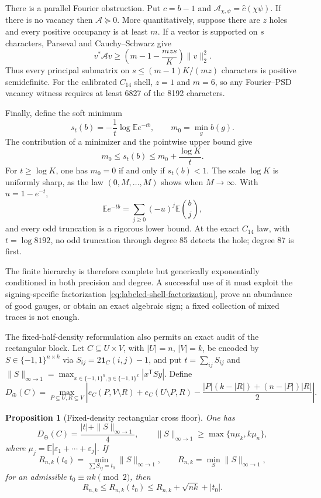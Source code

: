 \documentclass[11pt]{article}
\newtheorem{proposition}[theorem]{Proposition}
\newcommand{\eps}{\{-1,1\}}
\newcommand{\E}{\mathbb E}
\begin{document}
There is a parallel Fourier obstruction.  Put $c=b-1$ and
$\mathcal A_{\chi,\psi}=\widehat c(\chi\psi)$.  If there is no vacancy then
$\mathcal A\succeq0$.  More quantitatively, suppose there are $z$ holes and
every positive occupancy is at least $m$.  If a vector is supported on $s$
characters, Parseval and Cauchy--Schwarz give
\[
 v^*\mathcal Av\ge
 \left(m-1-\frac{mzs}{K}\right)\|v\|_2^2.
\]
Thus every principal submatrix on
$s\le(m-1)K/(mz)$ characters is positive semidefinite.  For the calibrated
$C_{14}$ shell, $z=1$ and $m=6$, so any Fourier--PSD vacancy witness requires
at least 6827 of the 8192 characters.

Finally, define the soft minimum
\[
 s_t(b)=-\frac1t\log\E e^{-tb},\qquad m_0=\min_gb(g).
\]
The contribution of a minimizer and the pointwise upper bound give
\begin{equation}
 m_0\le s_t(b)\le m_0+\frac{\log K}{t}.                \label{eq:soft-vacancy}
\end{equation}
For $t\ge\log K$, one has $m_0=0$ if and only if $s_t(b)<1$.  The scale
$\log K$ is uniformly sharp, as the law $(0,M,\ldots,M)$ shows when
$M\to\infty$.  With $u=1-e^{-t}$,
\[
 \E e^{-tb}=\sum_{j\ge0}(-u)^j\E\binom bj,
\]
and every odd truncation is a rigorous lower bound.  At the exact $C_{14}$
law, with $t=\log8192$, no odd truncation through degree 85 detects the hole;
degree 87 is first.

The finite hierarchy is therefore complete but generically exponentially
conditioned in both precision and degree.  A successful use of it must exploit
the signing-specific factorization
\eqref{eq:labeled-shell-factorization}, prove an abundance of good gauges, or
obtain an exact algebraic sign; a fixed collection of mixed traces is not
enough.

The fixed-half-density reformulation also permits an exact audit of the
rectangular block.  Let $C\subseteq U\times V$, with $|U|=n$, $|V|=k$, be
encoded by $S\in\eps^{n\times k}$ via
$S_{ij}=2\mathbf1_C(i,j)-1$, and put $t=\sum_{ij}S_{ij}$ and
$\|S\|_{\infty\to1}=\max_{x\in\eps^n,y\in\eps^k}|x^{\mathsf T}Sy|$.  Define
\[
 D_\oplus(C)=\max_{P\subseteq U,R\subseteq V}
 \left|e_C(P,V\setminus R)+e_C(U\setminus P,R)
 -\frac{|P|(k-|R|)+(n-|P|)|R|}{2}\right|.
\]

\begin{proposition}[Fixed-density rectangular cross floor]
\label{prop:fixed-density-cross-floor}
One has
\begin{equation}
 D_\oplus(C)=\frac{|t|+\|S\|_{\infty\to1}}4,
 \qquad
 \|S\|_{\infty\to1}\ge\max\{n\mu_k,k\mu_n\},
 \label{eq:fixed-density-cross-floor}
\end{equation}
where $\mu_j=\E|\varepsilon_1+\cdots+\varepsilon_j|$.  If
\[
 R_{n,k}(t_0)=\min_{\sum S_{ij}=t_0}\|S\|_{\infty\to1},
 \qquad R_{n,k}=\min_S\|S\|_{\infty\to1},
\]
for an admissible $t_0\equiv nk\pmod2$, then
\begin{equation}
 R_{n,k}\le R_{n,k}(t_0)
 \le R_{n,k}+\sqrt{nk}+|t_0|.
 \label{eq:fixed-density-cross-balance}
\end{equation}
\end{proposition}
\end{document}
